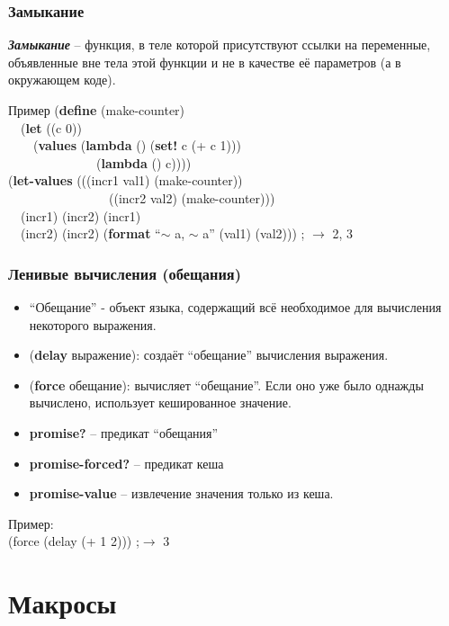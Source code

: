 \documentclass[16pt,pdf,unicode]{beamer}
\begin{document}
\begin{frame}
  \frametitle{Замыкание}
  {\bf \emph{Замыкание}} -- функция, в теле которой присутствуют ссылки на переменные, объявленные вне тела этой функции и не в качестве её параметров (а в окружающем коде).
\begin{exampleblock}{Пример}
  ({\bf define} (make-counter)\\
  \ \ ({\bf let} ((c 0))\\
  \ \ \ \ ({\bf values} ({\bf lambda} () ({\bf set!} c (+ c 1)))\\
  \ \ \ \ \ \ \ \ \ \ \ \ \ \ ({\bf lambda} () c))))\\
  \vspace{0.5cm}
  ({\bf let-values} (((incr1 val1) (make-counter))\\
  \ \ \ \ \ \ \ \ \ \ \ \ \ \ \ \ ((incr2 val2) (make-counter)))\\
  \ \ (incr1) (incr2) (incr1)\\
  \ \ (incr2) (incr2) ({\bf format} ``$\sim$ a, $\sim$ a'' (val1) (val2))) ; $\rightarrow$ 2, 3
\end{exampleblock}
\end{frame}

\begin{frame}
\frametitle{Ленивые вычисления (обещания)}
\begin{itemize}
\item ``Обещание'' - объект языка, содержащий всё необходимое для вычисления некоторого выражения.
\item ({\bf delay} выражение): создаёт ``обещание'' вычисления выражения.
\item ({\bf force} обещание): вычисляет ``обещание''. Если оно уже было однажды вычислено, использует кешированное значение.
\item {\bf promise?} -- предикат ``обещания''
\item {\bf promise-forced?} -- предикат кеша
\item {\bf promise-value} -- извлечение значения только из кеша.
\end{itemize}
Пример:\\
(force (delay (+ 1 2))) ;$\rightarrow$ 3
\end{frame}


\section{Макросы}
\begin{frame}
  \begin{center}
    \structure{\Huge \insertsection}
  \end{center}
\end{frame}
\end{document}
